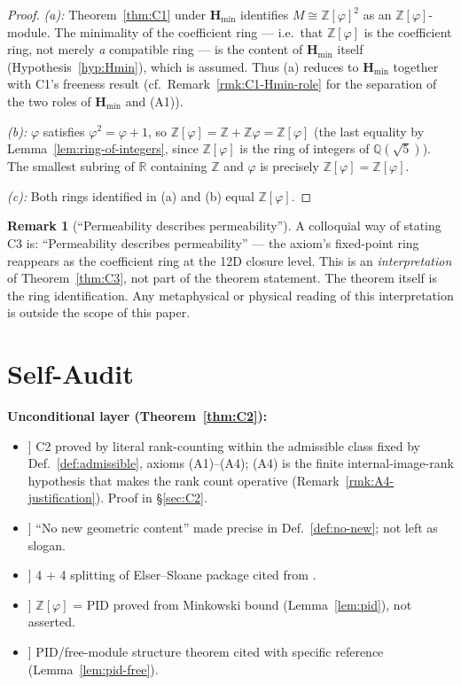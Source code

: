 \documentclass[11pt, a4paper]{amsart}
\theoremstyle{definition}
\newtheorem{remark}[theorem]{Remark}
\newcommand{\R}{\mathbb{R}}
\newcommand{\Q}{\mathbb{Q}}
\newcommand{\Z}{\mathbb{Z}}
\newcommand{\Hmin}{\mathbf{H}_{\min}}
\newcommand{\Ophi}{\mathbb{Z}[\varphi]}
\begin{document}
\begin{proof}
\emph{(a):} Theorem~\ref{thm:C1} under $\Hmin$ identifies $M
\cong \Ophi^{2}$ as an $\Ophi$-module. The minimality of the
coefficient ring — i.e.\ that $\Ophi$ is the coefficient ring,
not merely \emph{a} compatible ring — is the content of
$\Hmin$ itself (Hypothesis~\ref{hyp:Hmin}), which is assumed.
Thus (a) reduces to $\Hmin$ together with C1's freeness result
(cf.\ Remark~\ref{rmk:C1-Hmin-role} for the separation of the
two roles of $\Hmin$ and (A1)).

\emph{(b):} $\varphi$ satisfies $\varphi^2 = \varphi + 1$, so
$\Z[\varphi] = \Z + \Z\varphi = \Ophi$ (the last equality by
Lemma~\ref{lem:ring-of-integers}, since $\Ophi$ is the ring
of integers of $\Q(\sqrt{5})$). The smallest subring of $\R$
containing $\Z$ and $\varphi$ is precisely $\Z[\varphi] = \Ophi$.

\emph{(c):} Both rings identified in (a) and (b) equal $\Ophi$.
\end{proof}

\begin{remark}[``Permeability describes permeability'']
\label{rmk:self-ref}
A colloquial way of stating C3 is: ``Permeability describes
permeability'' --- the axiom's fixed-point ring reappears as
the coefficient ring at the 12D closure level. This is an
\emph{interpretation} of Theorem~\ref{thm:C3}, not part of the
theorem statement. The theorem itself is the ring identification.
Any metaphysical or physical reading of this interpretation is
outside the scope of this paper.
\end{remark}

\section{Self-Audit}
\label{sec:audit}

\textbf{Unconditional layer (Theorem~\ref{thm:C2}):}
\begin{itemize}
\item[[1]] C2 proved by literal rank-counting within the
  admissible class fixed by Def.~\ref{def:admissible}, axioms
  (A1)--(A4); (A4) is the finite internal-image-rank
  hypothesis that makes the rank count operative
  (Remark~\ref{rmk:A4-justification}). Proof in
  \S\ref{sec:C2}.
\item[[2]] ``No new geometric content'' made precise in
  Def.~\ref{def:no-new}; not left as slogan.
\item[[3]] 4 + 4 splitting of Elser--Sloane package cited from
  \cite{ConwaySloane, MoodyPatera, ElserSloane}.
\item[[4]] $\Z[\varphi]$ = PID proved from Minkowski bound
  (Lemma~\ref{lem:pid}), not asserted.
\item[[5]] PID/free-module structure theorem cited with
  specific reference (Lemma~\ref{lem:pid-free}).
\end{itemize}
\end{document}
